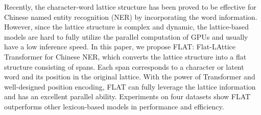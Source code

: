 Recently, the character-word lattice structure has been proved to be effective for Chinese named entity recognition (NER) by incorporating the word information. However, since the lattice structure is complex and dynamic, the lattice-based models are hard to fully utilize the parallel computation of GPUs and usually have a low inference speed. In this paper, we propose FLAT: Flat-LAttice Transformer for Chinese NER, which converts the lattice structure into a flat structure consisting of spans. Each span corresponds to a character or latent word and its position in the original lattice. With the power of Transformer and well-designed position encoding, FLAT can fully leverage the lattice information and has an excellent parallel ability. Experiments on four datasets show FLAT outperforms other lexicon-based models in performance and efficiency.
